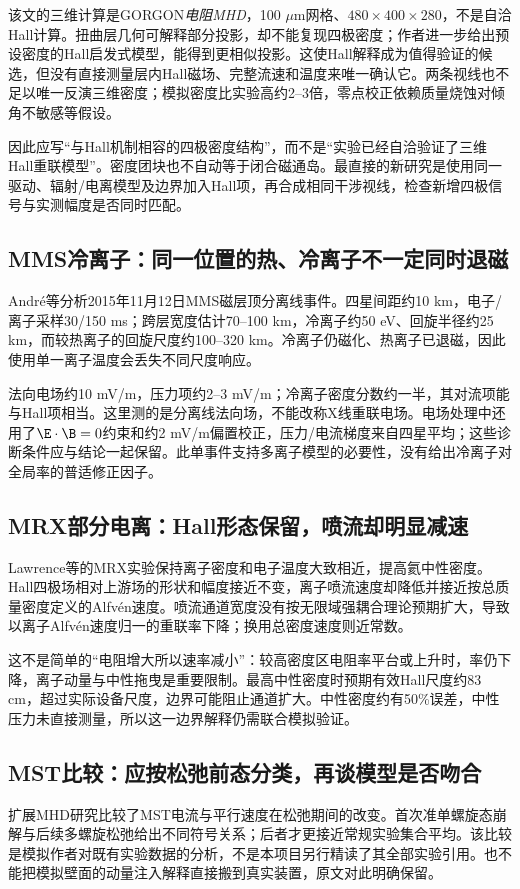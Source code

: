 \documentclass[UTF8,a4paper,11pt,openany,fontset=fandol]{ctexbook}
\begin{document}
该文的三维计算是GORGON\emph{电阻MHD}，100 $\mu$m网格、$480\times400\times280$，不是自洽Hall计算。扭曲层几何可解释部分投影，却不能复现四极密度；作者进一步给出预设密度的Hall启发式模型，能得到更相似投影。这使Hall解释成为值得验证的候选，但没有直接测量层内Hall磁场、完整流速和温度来唯一确认它。两条视线也不足以唯一反演三维密度；模拟密度比实验高约2--3倍，零点校正依赖质量烧蚀对倾角不敏感等假设。

因此应写“与Hall机制相容的四极密度结构”，而不是“实验已经自洽验证了三维Hall重联模型”。密度团块也不自动等于闭合磁通岛。最直接的新研究是使用同一驱动、辐射/电离模型及边界加入Hall项，再合成相同干涉视线，检查新增四极信号与实测幅度是否同时匹配。

\subsection{MMS冷离子：同一位置的热、冷离子不一定同时退磁}
André等\citep{L227}分析2015年11月12日MMS磁层顶分离线事件。四星间距约10 km，电子/离子采样30/150 ms；跨层宽度估计70--100 km，冷离子约50 eV、回旋半径约25 km，而较热离子的回旋尺度约100--320 km。冷离子仍磁化、热离子已退磁，因此使用单一离子温度会丢失不同尺度响应。

法向电场约10 mV/m，压力项约2--3 mV/m；冷离子密度分数约一半，其对流项能与Hall项相当。这里测的是分离线法向场，不能改称X线重联电场。电场处理中还用了$\E\cdot\B=0$约束和约2 mV/m偏置校正，压力/电流梯度来自四星平均；这些诊断条件应与结论一起保留。此单事件支持多离子模型的必要性，没有给出冷离子对全局率的普适修正因子。

\subsection{MRX部分电离：Hall形态保留，喷流却明显减速}
Lawrence等的MRX实验\citep{L190}保持离子密度和电子温度大致相近，提高氦中性密度。Hall四极场相对上游场的形状和幅度接近不变，离子喷流速度却降低并接近按总质量密度定义的Alfvén速度。喷流通道宽度没有按无限域强耦合理论预期扩大，导致以离子Alfvén速度归一的重联率下降；换用总密度速度则近常数。

这不是简单的“电阻增大所以速率减小”：较高密度区电阻率平台或上升时，率仍下降，离子动量与中性拖曳是重要限制。最高中性密度时预期有效Hall尺度约83 cm，超过实际设备尺度，边界可能阻止通道扩大。中性密度约有50\%误差，中性压力未直接测量，所以这一边界解释仍需联合模拟验证。

\subsection{MST比较：应按松弛前态分类，再谈模型是否吻合}
扩展MHD研究\citep{F798}比较了MST电流与平行速度在松弛期间的改变。首次准单螺旋态崩解与后续多螺旋松弛给出不同符号关系；后者才更接近常规实验集合平均。该比较是模拟作者对既有实验数据的分析，不是本项目另行精读了其全部实验引用。也不能把模拟壁面的动量注入解释直接搬到真实装置，原文对此明确保留。
\end{document}
